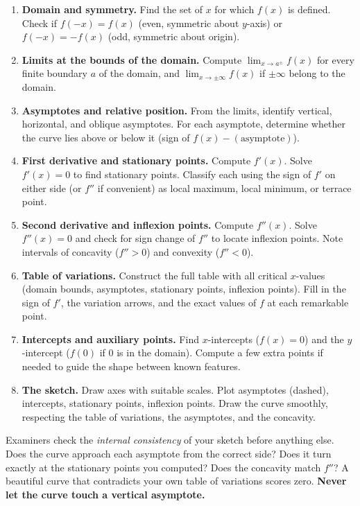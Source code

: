 \documentclass[11pt]{article}
\begin{document}
\begin{methode}
\begin{enumerate}
\item \textbf{Domain and symmetry.} Find the set of $x$ for which $f(x)$ is defined. Check if $f(-x)=f(x)$ (even, symmetric about $y$-axis) or $f(-x)=-f(x)$ (odd, symmetric about origin).
\item \textbf{Limits at the bounds of the domain.} Compute $\lim_{x\to a^\pm}f(x)$ for every finite boundary $a$ of the domain, and $\lim_{x\to\pm\infty}f(x)$ if $\pm\infty$ belong to the domain.
\item \textbf{Asymptotes and relative position.} From the limits, identify vertical, horizontal, and oblique asymptotes. For each asymptote, determine whether the curve lies above or below it (sign of $f(x)-(\text{asymptote})$).
\item \textbf{First derivative and stationary points.} Compute $f'(x)$. Solve $f'(x)=0$ to find stationary points. Classify each using the sign of $f'$ on either side (or $f''$ if convenient) as local maximum, local minimum, or terrace point.
\item \textbf{Second derivative and inflexion points.} Compute $f''(x)$. Solve $f''(x)=0$ and check for sign change of $f''$ to locate inflexion points. Note intervals of concavity ($f''>0$) and convexity ($f''<0$).
\item \textbf{Table of variations.} Construct the full table with all critical $x$-values (domain bounds, asymptotes, stationary points, inflexion points). Fill in the sign of $f'$, the variation arrows, and the exact values of $f$ at each remarkable point.
\item \textbf{Intercepts and auxiliary points.} Find $x$-intercepts ($f(x)=0$) and the $y$-intercept ($f(0)$ if $0$ is in the domain). Compute a few extra points if needed to guide the shape between known features.
\item \textbf{The sketch.} Draw axes with suitable scales. Plot asymptotes (dashed), intercepts, stationary points, inflexion points. Draw the curve smoothly, respecting the table of variations, the asymptotes, and the concavity.
\end{enumerate}
\end{methode}

\begin{attention}
Examiners check the \emph{internal consistency} of your sketch before anything else. Does the curve approach each asymptote from the correct side? Does it turn exactly at the stationary points you computed? Does the concavity match $f''$? A beautiful curve that contradicts your own table of variations scores zero. \textbf{Never let the curve touch a vertical asymptote.}
\end{attention}
\end{document}
